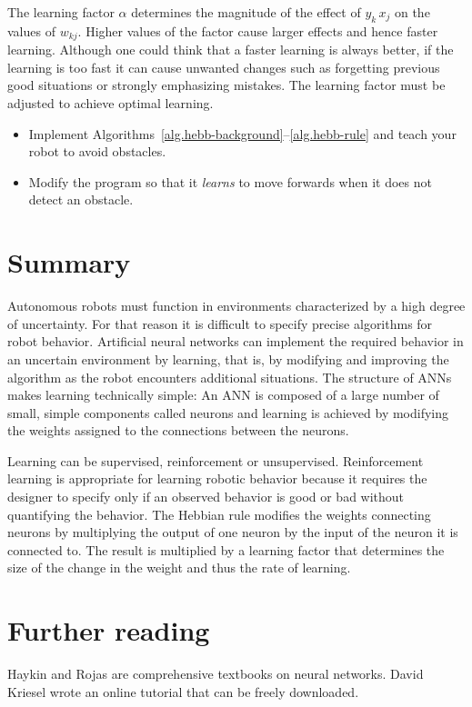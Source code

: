 The learning factor $\alpha$ determines the magnitude of the effect of $y_k\, x_j$ on the values of $w_{kj}$. Higher values of the factor cause larger effects and hence faster learning. Although one could think that a faster learning is always better, if the learning is too fast it can cause unwanted changes such as forgetting previous good situations or strongly emphasizing mistakes. The learning factor must be adjusted to achieve optimal learning.

\begin{framed}
\begin{itemize}
\item Implement Algorithms~\ref{alg.hebb-background}--\ref{alg.hebb-rule} and teach your robot to avoid obstacles.
\item Modify the program so that it \emph{learns} to move forwards when it does not detect an obstacle.
\end{itemize}
\end{framed}

\section{Summary}

Autonomous robots must function in environments characterized by a high degree of uncertainty. For that reason it is difficult to specify precise algorithms for robot behavior. Artificial neural networks can implement the required behavior in an uncertain environment by learning, that is, by modifying and improving the algorithm as the robot encounters additional situations. The structure of ANNs makes learning technically simple: An ANN is composed of a large number of small, simple components called neurons and learning is achieved by modifying the weights assigned to the connections between the neurons.

Learning can be supervised, reinforcement or unsupervised. Reinforcement learning is appropriate for learning robotic behavior because it requires the designer to specify only if an observed behavior is good or bad without quantifying the behavior. The Hebbian rule modifies the weights connecting neurons by multiplying the output of one neuron by the input of the neuron it is connected to. The result is multiplied by a learning factor that determines the size of the change in the weight and thus the rate of learning.

\section{Further reading}

Haykin \cite{haykin} and Rojas \cite{rojas} are comprehensive textbooks on neural networks. David Kriesel wrote an online tutorial \cite{kriesel} that can be freely downloaded.

